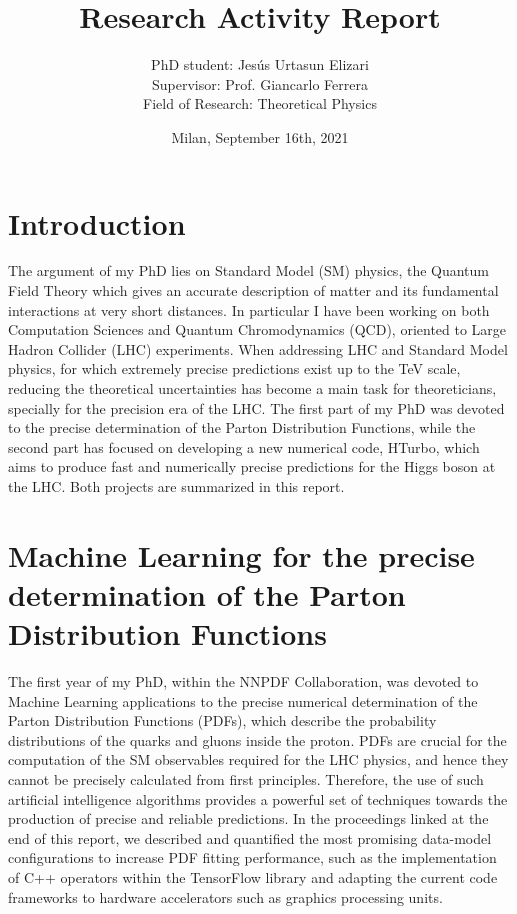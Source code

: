 \documentclass[12pt]{article}
\begin{document}
	
\title{Research Activity Report}
\author{PhD student: Jes\'us Urtasun Elizari \\
		Supervisor: Prof. Giancarlo Ferrera \\
		Field of Research: Theoretical Physics}
\date{Milan, September 16th, 2021}
\maketitle

\section{Introduction}

The argument of my PhD lies on Standard Model (SM) physics, the Quantum Field Theory which gives an accurate description of
matter and its fundamental interactions at very short distances. In particular I have been working on both Computation Sciences and Quantum Chromodynamics (QCD), oriented to Large Hadron Collider (LHC) experiments. When addressing LHC and Standard Model physics, for which extremely precise predictions exist up to the TeV scale, reducing the theoretical uncertainties has become a main task for theoreticians, specially for the precision era of the LHC. The first part of my PhD was devoted to the precise determination of the Parton Distribution Functions, while the second part has focused on developing a new numerical code, HTurbo, which aims to produce fast and numerically precise predictions for the Higgs boson at the LHC. Both projects are summarized in this report.\\

\section{Machine Learning for the precise determination of the Parton Distribution Functions}

The first year of my PhD, within the NNPDF Collaboration, was devoted to Machine Learning applications to the precise numerical determination of the Parton Distribution Functions (PDFs), which describe the probability distributions of the quarks and gluons inside the proton. PDFs are crucial for the computation of the SM observables required for the LHC physics, and hence they cannot be precisely calculated from first principles. Therefore, the use of such artificial intelligence algorithms provides a powerful set of techniques towards the production of precise and reliable predictions. In the proceedings linked at the end of this report, we described and quantified the most promising data-model configurations to increase PDF fitting performance, such as the implementation of C++ operators within the TensorFlow library and adapting the current code frameworks to hardware accelerators such as graphics processing units.\\
\end{document}
